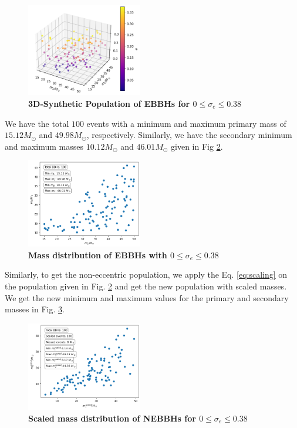 \documentclass[twocolumn,prd,nofootinbib]{revtex4}
\begin{document}
\begin{figure}[H]
\includegraphics[width=0.45\textwidth]{paper/figures/pop3d038.png}
\caption{\label{fig:pop3d038}\textbf{3D-Synthetic Population of EBBHs for $0\leq \sigma_e \leq 0.38$}}
\end{figure}

We have the total $100$ events with a minimum and maximum primary mass of $15.12 M_\odot$ and $49.98 M_\odot$, respectively. Similarly, we have the secondary minimum and maximum masses $10.12 M_\odot$ and $46.01 M_\odot$ given in Fig \ref{fig:pop2d038}.

\begin{figure}[H]
\includegraphics[width=0.45\textwidth]{paper/figures/pop2d038.png}
\caption{\label{fig:pop2d038}\textbf{Mass distribution of EBBHs with $0\leq \sigma_e \leq 0.38$}}
\end{figure}

Similarly, to get the non-eccentric population, we apply the Eq. \ref{eq:scaling} on the population given in Fig. \ref{fig:pop2d038} and get the new population with scaled masses. We get the new minimum and maximum values for the primary and secondary masses in Fig. \ref{fig:pop2d038scl}. 
   
\begin{figure}[H]
\includegraphics[width=0.45\textwidth]{paper/figures/pop2d038scl.png}
\caption{\label{fig:pop2d038scl}\textbf{Scaled mass distribution of NEBBHs for $0\leq \sigma_e \leq 0.38$}}
\end{figure}
\end{document}
